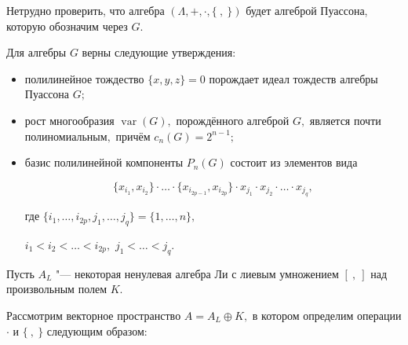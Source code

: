 Нетрудно проверить, что алгебра $(\Lambda,+,\cdot, \{ ~ , ~\})$ будет алгеброй Пуассона, которую обозначим через $G$.



\smallskip





\begin{theorem}

Для алгебры $G$ верны следующие утверждения\/$:$



\begin{itemize}



\item[\rm (i)] полилинейное тождество $\{x,y,z\}=0$  порождает идеал тождеств алгебры Пуассона $G;$



\item[\rm (ii)] рост многообразия $\mathop{var}(G),$ порождённого алгеброй $G,$ является почти полиномиальным$,$ причём $c_n(G)=2^{n-1};$



\item[\rm (iii)] базис полилинейной компоненты $P_n(G)$ состоит из элементов вида

$$

 \{x_{i_1},x_{i_2}\}\cdot \dots \cdot

\{x_{i_{2p-1}},x_{i_{2p}}\}\cdot x_{j_1}\cdot x_{j_2}

\cdot \dots \cdot x_{j_q},

$$

где $\{i_1, \dots ,i_{2p},j_1, \dots ,j_q\}=\{1, \dots ,n\},$

$i_1<i_2< \dots <i_{2p},$ $j_1< \dots <j_q.$





\end{itemize}



\end{theorem}



\smallskip



Пусть $A_L$ "--- некоторая ненулевая алгебра Ли с лиевым умножением $[~ , ~]$ над произвольным полем $K$. 

Рассмотрим векторное пространство $A = A_L \oplus K,$ в котором определим операции $\cdot$ и $\{~,~\}$ следующим образом: 

